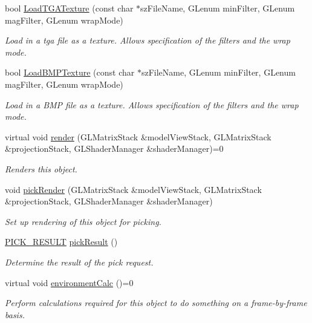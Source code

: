 \begin{DoxyCompactItemize}
\item 
bool \hyperlink{class_drawable_object_a64bea9df8fd8ebb1a9a2e83487400d75}{Load\-T\-G\-A\-Texture} (const char $\ast$sz\-File\-Name, G\-Lenum min\-Filter, G\-Lenum mag\-Filter, G\-Lenum wrap\-Mode)
\begin{DoxyCompactList}\small\item\em Load in a tga file as a texture. Allows specification of the filters and the wrap mode. \end{DoxyCompactList}\item 
bool \hyperlink{class_drawable_object_ad00e8ebe0da0c06651d9a42d77102885}{Load\-B\-M\-P\-Texture} (const char $\ast$sz\-File\-Name, G\-Lenum min\-Filter, G\-Lenum mag\-Filter, G\-Lenum wrap\-Mode)
\begin{DoxyCompactList}\small\item\em Load in a B\-M\-P file as a texture. Allows specification of the filters and the wrap mode. \end{DoxyCompactList}\item 
virtual void \hyperlink{class_drawable_object_abca3d859cccf27811a99fdd3f895b34a}{render} (G\-L\-Matrix\-Stack \&model\-View\-Stack, G\-L\-Matrix\-Stack \&projection\-Stack, G\-L\-Shader\-Manager \&shader\-Manager)=0
\begin{DoxyCompactList}\small\item\em Renders this object. \end{DoxyCompactList}\item 
void \hyperlink{class_drawable_object_a2fdf2f0139f965556fe56957e6ace856}{pick\-Render} (G\-L\-Matrix\-Stack \&model\-View\-Stack, G\-L\-Matrix\-Stack \&projection\-Stack, G\-L\-Shader\-Manager \&shader\-Manager)
\begin{DoxyCompactList}\small\item\em Set up rendering of this object for picking. \end{DoxyCompactList}\item 
\hyperlink{class_drawable_object_aa5a991e086b6d0a74bd538d69570da93}{P\-I\-C\-K\-\_\-\-R\-E\-S\-U\-L\-T} \hyperlink{class_drawable_object_ac8b2400d89e7f3372870322c773376af}{pick\-Result} ()
\begin{DoxyCompactList}\small\item\em Determine the result of the pick request. \end{DoxyCompactList}\item 
virtual void \hyperlink{class_drawable_object_a209194d1e8aa9d51f809625ddffb8bd0}{environment\-Calc} ()=0
\begin{DoxyCompactList}\small\item\em Perform calculations required for this object to do something on a frame-\/by-\/frame basis. \end{DoxyCompactList}\item 

\end{DoxyCompactItemize}
